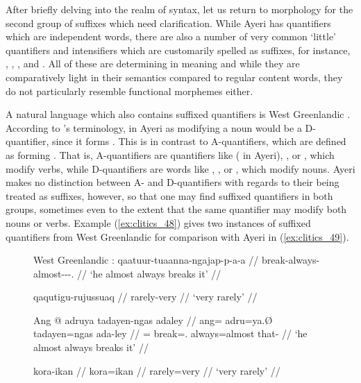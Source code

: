 \label{clitics_quant}
After briefly delving into the realm of syntax, let us return to morphology for
the second group of suffixes which need clarification. While Ayeri has
quantifiers which are independent words, there are also a number of very common
`little' quantifiers and intensifiers which are customarily spelled as
suffixes, for instance, ,
, , and
. All of these are determining in meaning and while
they are comparatively light in their semantics compared to regular content
words, they do not particularly resemble functional morphemes either.

A natural language which also contains suffixed quantifiers is West Greenlandic
\citep{bittner1995}. According to \citet{bittner1995}'s terminology,
 in Ayeri as modifying a noun would be a D-quantifier, since
it forms .
This is in contrast to A-quantifiers, which are defined as forming
. That is,
A-quantifiers are quantifiers like  ( in Ayeri),
, or , which modify verbs, while D-quantifiers are words
like , , or , which modify nouns. Ayeri makes no
distinction between A- and D-quantifiers with regards to their being treated as
suffixes, however, so that one may find suffixed quantifiers in both groups,
sometimes even to the extent that the same quantifier may modify both nouns or
verbs. Example (\ref{ex:clitics_48}) gives two instances of suffixed
quantifiers from West Greenlandic for comparison with Ayeri in
(\ref{ex:clitics_49}).

\begin{figure}[h]
\pex\label{ex:clitics_48}
West Greenlandic \citep[60, 63]{bittner1995}:
\a\label{ex:clitics_48a}\begingl
	\gla qaatuur-tuaanna-ngajap-p-a-a //
	\glb break-always-almost-\Ind{}-\Tr{}-\Tsg{}.\Tsg{} //
	\glft `he almost always breaks it' //
\endgl

\a\label{ex:clitics_48b}\begingl
	\gla qaqutigu-rujussuaq //
	\glb rarely-very //
	\glft `very rarely' //
\endgl
\xe
\end{figure}

\begin{figure}
\pex\label{ex:clitics_49}
\a\label{ex:clitics_49a}\begingl
	\gla Ang @ adruya tadayen-ngas adaley //
	\glb ang= adru=ya.Ø tadayen=ngas ada-ley //
	\glc \AgtT{}= break=\TsgM{}.\Top{} always=almost that-\PargI{} //
	\glft `he almost always breaks it' //
\endgl

\a\label{ex:clitics_49b}\begingl
	\gla kora-ikan //
	\glb kora=ikan //
	\glc rarely=very //
	\glft `very rarely' //
\endgl
\xe
\end{figure}

